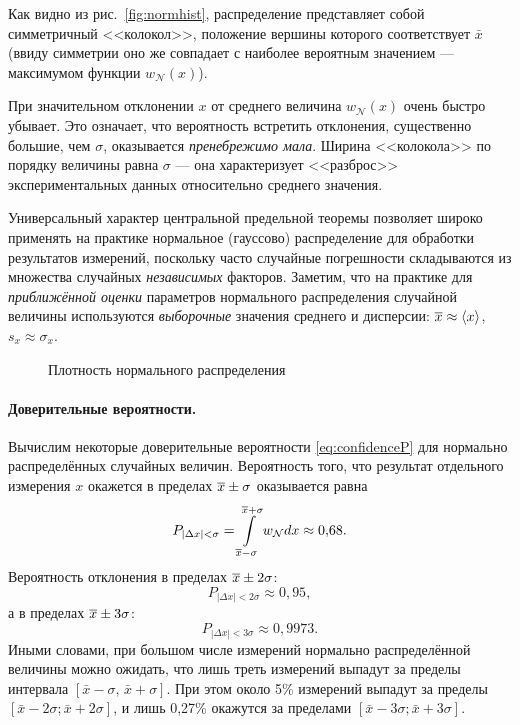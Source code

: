Как видно из рис.~\ref{fig:normhist}, распределение представляет собой
симметричный
<<колокол>>, положение вершины которого
соответствует $\bar{x}$ (ввиду симметрии оно же
совпадает с наиболее вероятным значением --- максимумом
функции $w_{\mathcal{N}}(x)$).

При значительном отклонении $x$ от среднего величина
$w_{\mathcal{N}}\!\left(x\right)$
очень быстро убывает. Это означает, что вероятность встретить отклонения,
существенно большие, чем $\sigma$, оказывается \emph{пренебрежимо
мала}. Ширина <<колокола>> по порядку величины
равна $\sigma$ --- она характеризует <<разброс>>
экспериментальных данных относительно среднего значения.


Универсальный характер центральной предельной теоремы позволяет широко
применять на практике нормальное (гауссово) распределение для обработки
результатов измерений, поскольку часто случайные погрешности складываются из
множества случайных \emph{независимых} факторов. Заметим, что на практике
для \emph{приближённой оценки} параметров нормального распределения
случайной величины используются \emph{выборочные} значения среднего
и дисперсии: $\overline{x}\approx\left<x\right>$, $s_{x}\approx\sigma_{x}$.

\begin{figure}[h]
    \centering
    
    \caption{Плотность нормального распределения}
\end{figure}

\paragraph{Доверительные вероятности.}
Вычислим некоторые доверительные вероятности \eqref{eq:confidenceP} для нормально
распределённых случайных величин.
Вероятность того, что результат отдельного измерения $x$ окажется
в пределах $\overline{x}\pm\sigma$ оказывается равна
\[
P_{\left|\Delta x\right|<\sigma} =
\int\limits_{\overline{x}-\sigma}^{\overline{x}+\sigma}
w_{\mathcal{N}} dx \approx0{,}68.
\]
Вероятность отклонения в пределах $\overline{x}\pm2\sigma$:
\[
P_{\left|\Delta x\right|<2\sigma}\approx0{,}95,
\]
а в пределах $\overline{x}\pm3\sigma$:
\[
P_{\left|\Delta x\right|<3\sigma}\approx0{,}9973.
\]
Иными словами, при большом числе измерений нормально распределённой
величины можно ожидать, что лишь треть измерений выпадут за пределы интервала
$\left[\bar{x}-\sigma,\,\bar{x}+\sigma\right]$. При этом около 5\%
измерений выпадут за пределы $\left[\bar{x}-2\sigma;\bar{x}+2\sigma\right]$,
и лишь 0,27\% окажутся за пределами
$\left[\bar{x}-3\sigma;\bar{x}+3\sigma\right]$.

